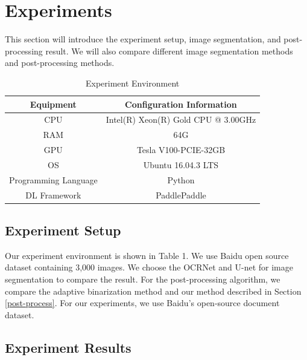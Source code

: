 \documentclass[10pt, conference, compsocconf]{IEEEtran}
\begin{document}
\section{Experiments}

This section will introduce the experiment setup, image segmentation, and post-processing result. We will also compare different image segmentation methods and post-processing methods. 

\begin{table}
	\caption{Experiment Environment}
	\begin{tabular}{cc}
		\hline Equipment & Configuration Information \\
		\hline CPU & Intel(R) Xeon(R) Gold CPU @ 3.00GHz \\
		 RAM & 64G \\
		 GPU & Tesla V100-PCIE-32GB \\
		 OS & Ubuntu 16.04.3 LTS \\
		 Programming Language & Python \\
		 DL Framework & PaddlePaddle \\
		\hline
	\end{tabular}
\end{table}

\subsection{Experiment Setup}


Our experiment environment is shown in Table 1. 
We use Baidu open source dataset containing 3,000 images. 
We choose the OCRNet\cite{yuan2020object} and U-net\cite{ronneberger2015u} for image segmentation to compare the result.
For the post-processing algorithm, we compare the adaptive binarization method and our method described in Section \ref{post-process}.
For our experiments, we use Baidu's open-source document dataset. 




\subsection{Experiment Results}
\end{document}
